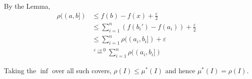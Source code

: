 \documentclass[12pt]{article}
\newcommand{\ep}{\varepsilon}
\begin{document}
    By the Lemma, 
    \begin{align*}
        \rho((a, b]) &\leq f(b) - f(x) + \frac{\ep}{2}\\ 
        &\leq \sum_{i=1}^n (f(b_i') - f(a_i)) + \frac{\ep}{2}\\ 
        &\leq \sum_{i=1}^n \rho((a_i, b_i]) + \ep\\
        &\overset{\ep \to 0}{=} \sum_{i=1}^n \rho((a_i, b_i])
    \end{align*}

    Taking the $\inf$ over all such covers,
    $\rho(I) \leq \mu^*(I)$ and hence $\mu^*(I) = \rho(I)$.
    
\color{black}
\end{document}
